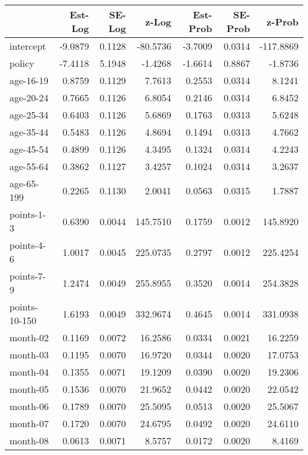 \documentclass[10pt]{article}
\begin{document}

\begin{table}[ht]
\centering
\begin{tabular}{lrrrrrr}
  \hline
 & Est-Log & SE-Log & z-Log & Est-Prob & SE-Prob & z-Prob \\ 
  \hline
intercept & -9.0879 & 0.1128 & -80.5736 & -3.7009 & 0.0314 & -117.8869 \\ 
  policy & -7.4118 & 5.1948 & -1.4268 & -1.6614 & 0.8867 & -1.8736 \\ 
  age-16-19 & 0.8759 & 0.1129 & 7.7613 & 0.2553 & 0.0314 & 8.1241 \\ 
  age-20-24 & 0.7665 & 0.1126 & 6.8054 & 0.2146 & 0.0314 & 6.8452 \\ 
  age-25-34 & 0.6403 & 0.1126 & 5.6869 & 0.1763 & 0.0313 & 5.6248 \\ 
  age-35-44 & 0.5483 & 0.1126 & 4.8694 & 0.1494 & 0.0313 & 4.7662 \\ 
  age-45-54 & 0.4899 & 0.1126 & 4.3495 & 0.1324 & 0.0314 & 4.2243 \\ 
  age-55-64 & 0.3862 & 0.1127 & 3.4257 & 0.1024 & 0.0314 & 3.2637 \\ 
  age-65-199 & 0.2265 & 0.1130 & 2.0041 & 0.0563 & 0.0315 & 1.7887 \\ 
  points-1-3 & 0.6390 & 0.0044 & 145.7510 & 0.1759 & 0.0012 & 145.8920 \\ 
  points-4-6 & 1.0017 & 0.0045 & 225.0735 & 0.2797 & 0.0012 & 225.4254 \\ 
  points-7-9 & 1.2474 & 0.0049 & 255.8955 & 0.3520 & 0.0014 & 254.3828 \\ 
  points-10-150 & 1.6193 & 0.0049 & 332.9674 & 0.4645 & 0.0014 & 331.0938 \\ 
  month-02 & 0.1169 & 0.0072 & 16.2586 & 0.0334 & 0.0021 & 16.2259 \\ 
  month-03 & 0.1195 & 0.0070 & 16.9720 & 0.0344 & 0.0020 & 17.0753 \\ 
  month-04 & 0.1355 & 0.0071 & 19.1209 & 0.0390 & 0.0020 & 19.2306 \\ 
  month-05 & 0.1536 & 0.0070 & 21.9652 & 0.0442 & 0.0020 & 22.0542 \\ 
  month-06 & 0.1789 & 0.0070 & 25.5095 & 0.0513 & 0.0020 & 25.5067 \\ 
  month-07 & 0.1720 & 0.0070 & 24.6795 & 0.0492 & 0.0020 & 24.6110 \\ 
  month-08 & 0.0613 & 0.0071 & 8.5757 & 0.0172 & 0.0020 & 8.4169 \\ 

\end{tabular}
\end{table}
\end{document}
